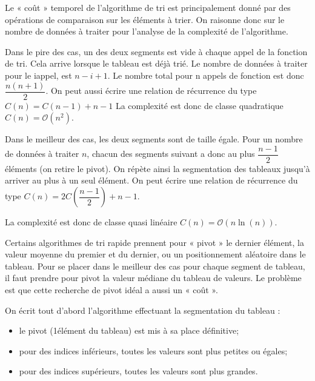\documentclass[10pt,fleqn]{article} %
\begin{document}
Le « coût » temporel de l'algorithme de tri est principalement donné par des opérations de comparaison sur les éléments à trier. On raisonne donc sur le nombre de données à traiter pour l'analyse de la complexité de l'algorithme.

Dans le pire des cas, un des deux segments est vide à chaque appel de la fonction de tri. Cela arrive lorsque le tableau est déjà trié. Le nombre de données à traiter  pour le i\ieme appel, est $n - i + 1$.
Le nombre total pour n appels de fonction est donc $\dfrac{n(n+1)}{2}$. On peut aussi écrire une relation de récurrence du type $C(n) = C(n-1) + n - 1$
La complexité est donc de classe quadratique $C(n) = \mathcal{O}\left(n^2\right)$.

Dans le meilleur des cas, les deux segments sont de taille égale. Pour un nombre de données à traiter $n$, chacun des segments suivant a donc au plus $\dfrac{n-1}{2}$ éléments (on retire le pivot). On répète ainsi la segmentation des tableaux jusqu'à arriver au plus à un seul élément. 
On peut écrire une relation de récurrence du type $C(n) = 2 C\left(\dfrac{n - 1}{ 2} \right)  +  n - 1$.
 
La complexité est donc de classe quasi linéaire $C(n)=\mathcal{O}\left(n \ln(n)\right)$.

\begin{rem}
Certains algorithmes de tri rapide prennent pour « pivot » le dernier élément, la valeur moyenne du premier et du dernier, ou un positionnement aléatoire dans le tableau. Pour se placer dans le meilleur des cas pour chaque segment de tableau, il faut prendre pour pivot la valeur médiane du tableau de valeurs. Le problème est que cette recherche de pivot idéal a aussi un « coût ».
\end{rem}

On écrit tout d'abord l'algorithme effectuant la segmentation du tableau :
\begin{itemize}
\item le pivot (1\ier élément du tableau) est mis à sa place définitive;
\item pour des indices inférieurs, toutes les valeurs sont plus petites ou égales;
\item pour des indices supérieurs, toutes les valeurs sont plus grandes.
\end{itemize}
\end{document}
